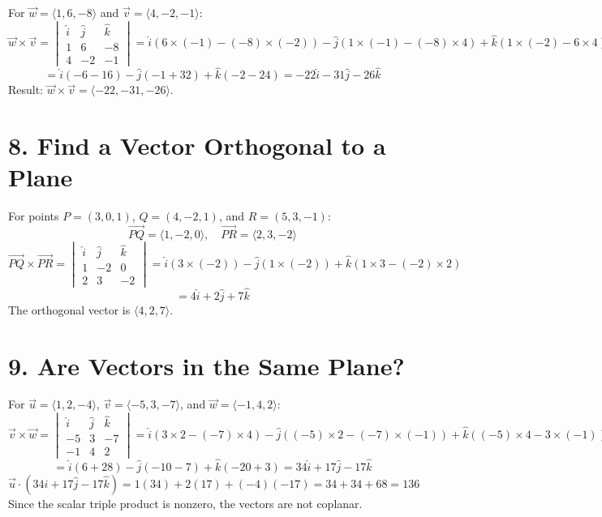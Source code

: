 \documentclass[11pt]{article}
\begin{document}
For $\vec{w} = \langle 1, 6, -8 \rangle$ and $\vec{v} = \langle 4, -2, -1 \rangle$:
\[
\vec{w} \times \vec{v} = \begin{vmatrix} \hat{i} & \hat{j} & \hat{k} \\ 1 & 6 & -8 \\ 4 & -2 & -1 \end{vmatrix}
= \hat{i}(6 \times (-1) - (-8) \times (-2)) - \hat{j}(1 \times (-1) - (-8) \times 4) + \hat{k}(1 \times (-2) - 6 \times 4)
\]
\[
= \hat{i}(-6 - 16) - \hat{j}(-1 + 32) + \hat{k}(-2 - 24) = -22\hat{i} - 31\hat{j} - 26\hat{k}
\]
Result: $\vec{w} \times \vec{v} = \langle -22, -31, -26 \rangle$.

\section*{8. Find a Vector Orthogonal to a Plane}

For points $P = (3, 0, 1)$, $Q = (4, -2, 1)$, and $R = (5, 3, -1)$:
\[
\vec{PQ} = \langle 1, -2, 0 \rangle, \quad \vec{PR} = \langle 2, 3, -2 \rangle
\]
\[
\vec{PQ} \times \vec{PR} = \begin{vmatrix} \hat{i} & \hat{j} & \hat{k} \\ 1 & -2 & 0 \\ 2 & 3 & -2 \end{vmatrix}
= \hat{i}(3 \times (-2)) - \hat{j}(1 \times (-2)) + \hat{k}(1 \times 3 - (-2) \times 2)
\]
\[
= 4\hat{i} + 2\hat{j} + 7\hat{k}
\]
The orthogonal vector is $\langle 4, 2, 7 \rangle$.

\section*{9. Are Vectors in the Same Plane?}

For $\vec{u} = \langle 1, 2, -4 \rangle$, $\vec{v} = \langle -5, 3, -7 \rangle$, and $\vec{w} = \langle -1, 4, 2 \rangle$:
\[
\vec{v} \times \vec{w} = \begin{vmatrix} \hat{i} & \hat{j} & \hat{k} \\ -5 & 3 & -7 \\ -1 & 4 & 2 \end{vmatrix}
= \hat{i}(3 \times 2 - (-7) \times 4) - \hat{j}((-5) \times 2 - (-7) \times (-1)) + \hat{k}((-5) \times 4 - 3 \times (-1))
\]
\[
= \hat{i}(6 + 28) - \hat{j}(-10 - 7) + \hat{k}(-20 + 3) = 34\hat{i} + 17\hat{j} - 17\hat{k}
\]
\[
\vec{u} \cdot (34\hat{i} + 17\hat{j} - 17\hat{k}) = 1(34) + 2(17) + (-4)(-17) = 34 + 34 + 68 = 136
\]
Since the scalar triple product is nonzero, the vectors are not coplanar.
\end{document}
